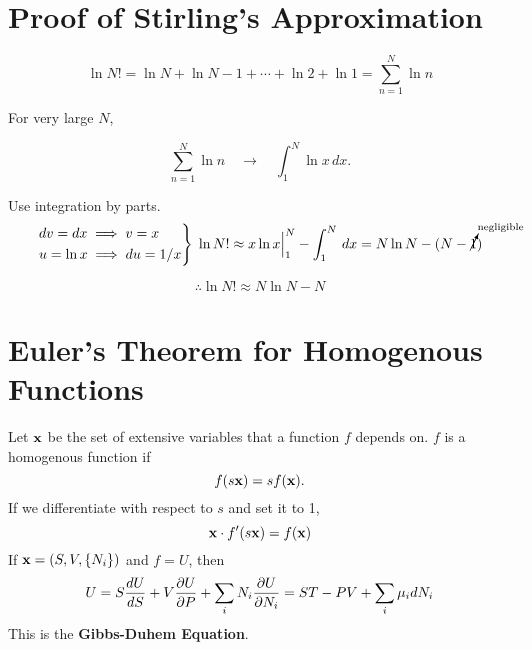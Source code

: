 \begin{appendices}
    \chapter{Proof of Stirling's Approximation}
        \begin{equation}
            \ln{N!} = \ln{N}+\ln{N-1}+\cdots+\ln{2}+\ln{1}=\sum^N_{n=1}\ln{n}
        \end{equation}
        
        For very large $N$,
        
        \begin{equation}
            \sum^N_{n=1}\ln{n} \quad \longrightarrow  \quad \int_{1}^{N} \ln{x} \,dx .
        \end{equation}
        
        Use integration by parts.
        \begin{equation}
            \begin{rcases}
                dv=dx \implies v=x \\ u=\ln{x} \implies du=1/x
            \end{rcases}\;
            \ln{N!}\approx x\ln{x}\Big|_1^N - \int_1^N \,dx = N\ln{N}-(N-\cancelto{\scriptsize{\textrm{negligible}}}{1})
        \end{equation}
        
        \begin{equation}
            \therefore \ln{N!}\approx N \ln{N} - N
        \end{equation}



    \chapter{Euler's Theorem for Homogenous Functions}

        Let $\mathbf{x}$ be the set of extensive variables that a function $f$ depends on. $f$ is a homogenous function if 
            \begin{equation}
                f(s\mathbf{x})=sf(\mathbf{x}).
            \end{equation}
            If we differentiate with respect to $s$ and set it to 1,
            \begin{equation}
                \mathbf{x}\cdot f'(s\mathbf{x})=f(\mathbf{x})
            \end{equation}
            If $\mathbf{x}=(S,V,\{N_i\})$ and $f=U$, then
            \begin{equation}
                U = S \frac{d U}{d S}+V \frac{\partial U}{\partial P}+\sum_i N_i \frac{\partial U}{\partial N_i}=ST-PV+\sum_i \mu_idN_i
            \end{equation}
            This is the \textbf{Gibbs-Duhem Equation}.     
            

\end{appendices}
